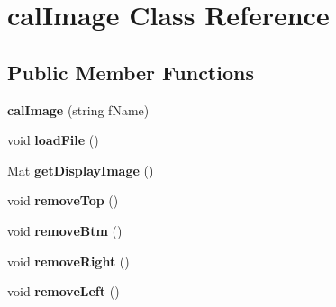 \hypertarget{classcalImage}{}\section{cal\+Image Class Reference}
\label{classcalImage}
\subsection*{Public Member Functions}
\begin{DoxyCompactItemize}
\item 
{\bfseries cal\+Image} (string f\+Name)\hypertarget{classcalImage_a3259ab84fa9fe3580ace31fcbf530355}{}\label{classcalImage_a3259ab84fa9fe3580ace31fcbf530355}

\item 
void {\bfseries load\+File} ()\hypertarget{classcalImage_a25a15922791df037d2bf8cbd1554caab}{}\label{classcalImage_a25a15922791df037d2bf8cbd1554caab}

\item 
Mat {\bfseries get\+Display\+Image} ()\hypertarget{classcalImage_a6b5eb7212ffa855e94b73c4db4299e7d}{}\label{classcalImage_a6b5eb7212ffa855e94b73c4db4299e7d}

\item 
void {\bfseries remove\+Top} ()\hypertarget{classcalImage_ac2405b1109353fbc18c5c52f95ecab02}{}\label{classcalImage_ac2405b1109353fbc18c5c52f95ecab02}

\item 
void {\bfseries remove\+Btm} ()\hypertarget{classcalImage_ac871f35ecbe839979420a3180ab449cf}{}\label{classcalImage_ac871f35ecbe839979420a3180ab449cf}

\item 
void {\bfseries remove\+Right} ()\hypertarget{classcalImage_afc32b4e199f9ede93c8caef1258a6808}{}\label{classcalImage_afc32b4e199f9ede93c8caef1258a6808}

\item 
void {\bfseries remove\+Left} ()\hypertarget{classcalImage_ae27dc9e5fc7a7568027674d6fd26d9b5}{}\label{classcalImage_ae27dc9e5fc7a7568027674d6fd26d9b5}

\end{DoxyCompactItemize}
